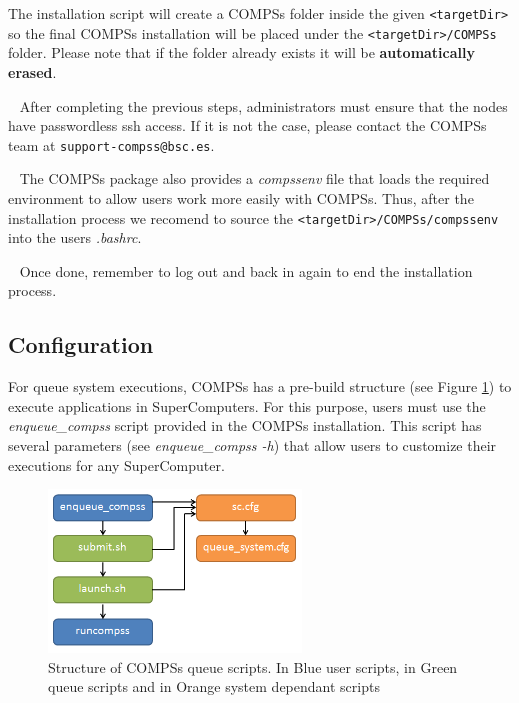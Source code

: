 The installation script will create a COMPSs folder inside the given \verb|<targetDir>| so the final COMPSs installation will be placed 
under the \verb|<targetDir>/COMPSs| folder. Please note that if the folder already exists it will be \textbf{automatically erased}.

~ \newline
After completing the previous steps, administrators must ensure that the nodes have passwordless ssh access. If it is not the case,
please contact the COMPSs team at \verb|support-compss@bsc.es|.

~ \newline
The COMPSs package also provides a \textit{compssenv} file that loads the required environment to allow users work more easily
with COMPSs. Thus, after the installation process we recomend to source the \verb|<targetDir>/COMPSs/compssenv| into the 
users \textit{.bashrc}.

~ \newline
Once done, remember to log out and back in again to end the installation process.

\subsection{Configuration}
For queue system executions, COMPSs has a pre-build structure (see Figure \ref{fig:queue_scripts_structure}) to execute 
applications in SuperComputers. For this purpose, users must use the \textit{enqueue\_compss} script provided in the COMPSs installation.
This script has several parameters (see \textit{enqueue\_compss -h}) that allow users to customize their executions for any SuperComputer.

\begin{figure}[h!]
  \centering
    \includegraphics[width=0.6\textwidth]{./Sections/07_Supercomputers/Figures/queue_scripts_structure.png}
    \caption{Structure of COMPSs queue scripts. In Blue user scripts, in Green queue scripts and in Orange system dependant scripts}
    \label{fig:queue_scripts_structure}
\end{figure}

